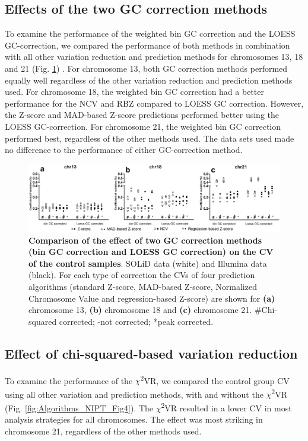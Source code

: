 \subsection{Effects of the two GC correction methods}
To examine the performance of the weighted bin GC correction and the LOESS GC-correction, we compared the performance of both methods in combination with all other variation reduction and prediction methods for chromosomes 13, 18 and 21 (Fig. \ref{fig:Algorithms_NIPT_Fig3}) . 
For chromosome 13, both GC correction methods performed equally well regardless of the other variation reduction and prediction methods used. 
For chromosome 18, the weighted bin GC correction had a better performance for the NCV and RBZ compared to LOESS GC correction. 
However, the Z-score and MAD-based Z-score predictions performed better using the LOESS GC-correction. 
For chromosome 21, the weighted bin GC correction performed best, regardless of the other methods used. 
The data sets used made no difference to the performance of either GC-correction method.

\begin{figure}
	\includegraphics[width=1.0\linewidth]{img/Algorithms_NIPT_Fig3}
	\caption[Comparison of the effect of two GC correction methods]{\textbf{Comparison of the effect of two GC correction methods (bin GC correction and LOESS GC correction) on the CV of the control samples}. SOLiD data (white) and Illumina data (black). For each type of correction the CVs of four prediction algorithms (standard Z-score, MAD-based Z-score, Normalized Chromosome Value and regression-based Z-score) are shown for \textbf{(a)} chromosome 13, \textbf{(b)} chromosome 18 and \textbf{(c)} chromosome 21. \#Chi-squared corrected; -not corrected; *peak corrected.}
	\label{fig:Algorithms_NIPT_Fig3}
\end{figure}

\subsection{Effect of chi-squared-based variation reduction}
To examine the performance of the $\chi$\textsuperscript{2}VR, we compared the control group CV using all other variation and prediction methods, with and without the $\chi$\textsuperscript{2}VR (Fig. \ref{fig:Algorithms_NIPT_Fig4}).
The $\chi$\textsuperscript{2}VR resulted in a lower CV in most analysis strategies for all chromosomes. 
The effect was most striking in chromosome 21, regardless of the other methods used.

